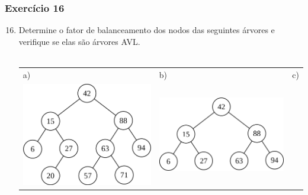 \documentclass[aspectratio=169]{beamer}
\begin{document}
\begin{frame}[fragile]\frametitle{Exercício 16}
\begin{enumerate}
	\setcounter{enumi}{15}
	\item Determine o fator de balanceamento dos nodos das seguintes árvores e verifique se elas são árvores AVL.\\~\\
\begin{tabular}{lll}		
a) & b) & c)\\
\includegraphics[height=0.4\paperheight]{imagens/avl08.png} &
\includegraphics[height=0.3\paperheight]{imagens/avl09.png} &

\end{tabular}
\end{enumerate}
\end{frame}
\end{document}
